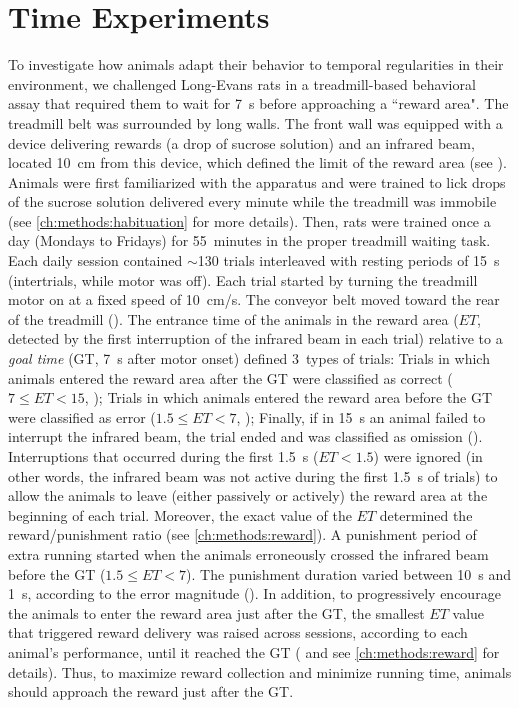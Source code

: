 \chapter{Time Experiments} \label{ch:time}

To investigate how animals adapt their behavior to temporal regularities in their environment, we challenged Long-Evans rats in a treadmill-based behavioral assay that required them to wait for 7~s before approaching a ``reward area".\footnotemark
{}
The treadmill belt was surrounded by long walls.
The front wall was equipped with a device delivering rewards (a drop of sucrose solution) and an infrared beam, located 10~cm from this device, which defined the limit of the reward area (see ).
Animals were first familiarized with the apparatus and were trained to lick drops of the sucrose solution delivered every minute while the treadmill was immobile (see \autoref{ch:methods:habituation} for more details).
Then, rats were trained once a day (Mondays to Fridays) for 55~minutes in the proper treadmill waiting task.
Each daily session contained $\sim$130 trials interleaved with resting periods of 15~s (intertrials, while motor was off).
Each trial started by turning the treadmill motor on at a fixed speed of 10~cm/s.
The conveyor belt moved toward the rear of the treadmill ().
The entrance time of the animals in the reward area ($ET$, detected by the first interruption of the infrared beam in each trial) relative to a \emph{goal time} (GT, 7~s after motor onset) defined 3~types of trials:
    Trials in which animals entered the reward area after the GT were classified as correct ($7\leq ET<15$, );
    Trials in which animals entered the reward area before the GT were classified as error ($1.5\leq ET<7$, );
    Finally, if in 15~s an animal failed to interrupt the infrared beam, the trial ended and was classified as omission ().
Interruptions that occurred during the first 1.5~s ($ET<1.5$) were ignored (in other words, the infrared beam was not active during the first 1.5~s of trials) to allow the animals to leave (either passively or actively) the reward area at the beginning of each trial.
Moreover, the exact value of the $ET$ determined the reward/punishment ratio (see \autoref{ch:methods:reward}).
A punishment period of extra running started when the animals erroneously crossed the infrared beam before the GT ($1.5\leq ET<7$).
The punishment duration varied between 10~s and 1~s, according to the error magnitude ().
In addition, to progressively encourage the animals to enter the reward area just after the GT, the smallest $ET$ value that triggered reward delivery was raised across sessions, according to each animal's performance, until it reached the GT ( and see \autoref{ch:methods:reward} for details).
Thus, to maximize reward collection and minimize running time, animals should approach the reward just after the GT.

